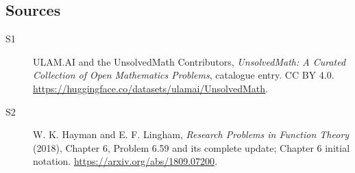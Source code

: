 \documentclass[11pt]{article}
\begin{document}
\subsection{Sources}
\begin{description}
\item[\hypertarget{source:statement:1}{S1}] ULAM.AI and the UnsolvedMath Contributors, \emph{UnsolvedMath: A Curated Collection of Open Mathematics Problems}, catalogue entry. CC BY 4.0. \url{https://huggingface.co/datasets/ulamai/UnsolvedMath}.
\item[\hypertarget{source:statement:2}{S2}] W. K. Hayman and E. F. Lingham, \emph{Research Problems in Function Theory} (2018), Chapter 6, Problem 6.59 and its complete update; Chapter 6 initial notation. \url{https://arxiv.org/abs/1809.07200}.
\end{description}
\label{end:statement}
\end{document}
